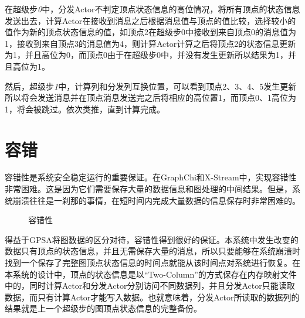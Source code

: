 在超级步\textit{0}中，分发Actor不判定顶点状态信息的高位情况，将所有顶点的状态信息发送出去，计算Actor在接收到消息之后根据消息值与顶点的值比较，选择较小的值作为新的顶点状态信息的值，如顶点2在超级步0中接收到来自顶点0的消息值为1，接收到来自顶点3的消息值为4，则计算Actor计算之后将顶点2的状态信息更新为1，并且高位为0，而顶点0由于在超级步0中，并没有发生更新所以结果为1，并且高位为1。

然后，超级步\textit{1}中，计算列和分发列互换位置，可以看到顶点2、3、4、5发生更新所以将会发送消息并在顶点消息发送完之后将相应的高位置1，而顶点0、1高位为1，将会被跳过。依次类推，直到计算完成。

\section{容错}

容错性是系统安全稳定运行的重要保证。在GraphChi和X-Stream中，实现容错性非常困难。这是因为它们需要保存大量的数据信息和图处理的中间结果。但是，系统崩溃往往是一刹那的事情，在短时间内完成大量数据的信息保存时非常困难的。

\begin{figure}[htbp]
  \centering
  \caption{容错性}\label{fig:ft}
\vspace{\baselineskip}
\end{figure}

得益于GPSA将图数据的区分对待，容错性得到很好的保证。本系统中发生改变的数据只有顶点的状态信息，并且无需保存大量的消息，所以只要能够在系统崩溃时找到一个保存了完整图顶点状态信息的时间点就能从该时间点对系统进行恢复。在本系统的设计中，顶点的状态信息是以“Two-Column”的方式保存在内存映射文件中的，同时计算Actor和分发Actor分别访问不同数据列，并且分发Actor只能读取数据，而只有计算Actor才能写入数据。也就意味着，分发Actor所读取的数据列的结果就是上一个超级步的图顶点状态信息的完整备份。

